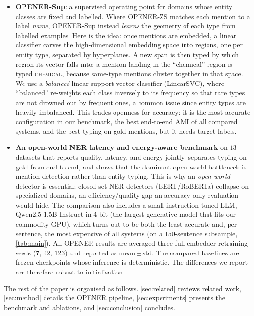 \begin{itemize}
\item \textbf{OPENER-Sup}: a supervised operating point for domains whose entity classes are fixed and labelled. Where OPENER-ZS matches each mention to a label \emph{name}, OPENER-Sup instead \emph{learns} the geometry of each type from labelled examples. Here is the idea: once mentions are embedded, a linear classifier carves the high-dimensional embedding space into regions, one per entity type, separated by hyperplanes. A new span is then typed by which region its vector falls into: a mention landing in the ``chemical'' region is typed \textsc{chemical}, because same-type mentions cluster together in that space. We use a \emph{balanced} linear support-vector classifier (LinearSVC), where ``balanced'' re-weights each class inversely to its frequency so that rare types are not drowned out by frequent ones, a common issue since entity types are heavily imbalanced. This trades openness for accuracy: it is the most accurate configuration in our benchmark, the best end-to-end AMI of all compared systems, and the best typing on gold mentions, but it needs target labels.
\item \textbf{An open-world NER latency and energy-aware benchmark} on $13$ datasets that reports quality, latency, and energy jointly, separates typing-on-gold from end-to-end, and shows that the dominant open-world bottleneck is mention detection rather than entity typing. This is why an \emph{open-world} detector is essential: closed-set NER detectors (BERT/RoBERTa) collapse on specialized domains, an efficiency/quality gap an accuracy-only evaluation would hide. The comparison also includes a small instruction-tuned LLM, Qwen2.5-1.5B-Instruct in 4-bit (the largest generative model that fits our commodity GPU), which turns out to be both the least accurate and, per sentence, the most expensive of all systems (on a $150$-sentence subsample, \autoref{tab:main}). All OPENER results are averaged three full embedder-retraining seeds ($7$, $42$, $123$) and reported as mean\,$\pm$\,std. The compared baselines are frozen checkpoints whose inference is deterministic. The differences we report are therefore robust to initialisation.
\end{itemize}

The rest of the paper is organised as follows.
\autoref{sec:related} reviews related work, \autoref{sec:method} details the OPENER pipeline, \autoref{sec:experiments} presents the benchmark and ablations, and \autoref{sec:conclusion} concludes.
